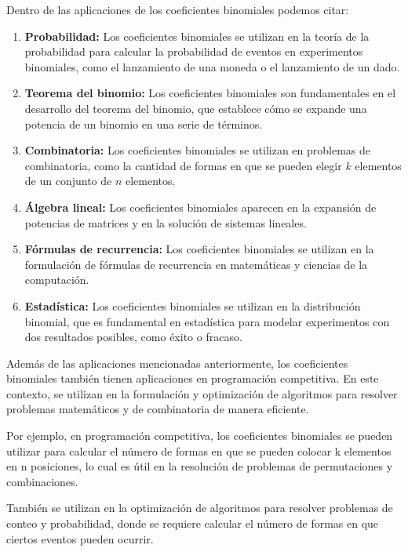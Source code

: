 Dentro de las aplicaciones de los coeficientes binomiales podemos citar:

\begin{enumerate}
	\item \textbf{Probabilidad:} Los coeficientes binomiales se utilizan en la teoría de la probabilidad para calcular la probabilidad de eventos en experimentos binomiales, como el lanzamiento de una moneda o el lanzamiento de un dado.
	\item \textbf{Teorema del binomio:} Los coeficientes binomiales son fundamentales en el desarrollo del teorema del binomio, que establece cómo se expande una potencia de un binomio en una serie de términos.
	\item \textbf{Combinatoria:} Los coeficientes binomiales se utilizan en problemas de combinatoria, como la cantidad de formas en que se pueden elegir $k$ elementos de un conjunto de $n$ elementos.
	\item \textbf{ Álgebra lineal:} Los coeficientes binomiales aparecen en la expansión de potencias de matrices y en la solución de sistemas lineales.
	\item \textbf{Fórmulas de recurrencia:} Los coeficientes binomiales se utilizan en la formulación de fórmulas de recurrencia en matemáticas y ciencias de la computación.
	\item \textbf{Estadística:} Los coeficientes binomiales se utilizan en la distribución binomial, que es fundamental en estadística para modelar experimentos con dos resultados posibles, como éxito o fracaso.
\end{enumerate}

Además de las aplicaciones mencionadas anteriormente, los coeficientes binomiales también tienen aplicaciones en programación competitiva. En este contexto, se utilizan en la formulación y optimización de algoritmos para resolver problemas matemáticos y de combinatoria de manera eficiente.

Por ejemplo, en programación competitiva, los coeficientes binomiales se pueden utilizar para calcular el número de formas en que se pueden colocar k elementos en n posiciones, lo cual es útil en la resolución de problemas de permutaciones y combinaciones.

También se utilizan en la optimización de algoritmos para resolver problemas de conteo y probabilidad, donde se requiere calcular el número de formas en que ciertos eventos pueden ocurrir.